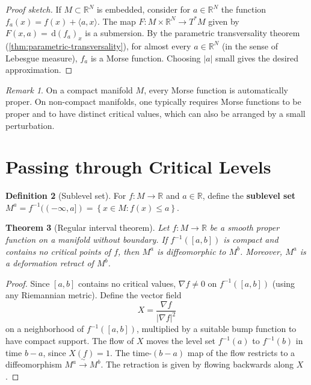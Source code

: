 \documentclass[12pt,a4paper,openany]{book}
\newtheorem{theorem}{Theorem}[section]
\theoremstyle{definition}
\newtheorem{definition}[theorem]{Definition}
\theoremstyle{remark}
\newtheorem{remark}[theorem]{Remark}
\newcommand{\R}{\mathbb{R}}
\newcommand{\dd}{\,\mathrm{d}}
\newcommand{\abs}[1]{\left\lvert #1 \right\rvert}
\newcommand{\set}[1]{\left\{ #1 \right\}}
\begin{document}
\begin{proof}[Proof sketch]
If $M \subset \R^N$ is embedded, consider for $a \in \R^N$ the function
$f_a(x) = f(x) + \langle a, x\rangle$. The map
$F\colon M \times \R^N \to T^*M$ given by $F(x,a) = \dd(f_a)_x$ is
a submersion. By the parametric transversality theorem
(\autoref{thm:parametric-transversality}),
for almost every $a \in \R^N$ (in the sense of Lebesgue measure),
$f_a$ is a Morse function. Choosing $\abs{a}$ small gives
the desired approximation.
\end{proof}

\begin{remark}\label{rem:morse-proper}
On a compact manifold $M$, every Morse function is automatically proper.
On non-compact manifolds, one typically requires Morse functions to be
proper and to have distinct critical values, which can also be arranged
by a small perturbation.
\end{remark}

\section{Passing through Critical Levels}\label{sec:critical-levels}

\begin{definition}[Sublevel set]\label{def:sublevel}
For $f\colon M \to \R$ and $a \in \R$, define the \textbf{sublevel set}
$M^a = f^{-1}((-\infty,a]) = \set{x \in M : f(x) \le a}$.
\end{definition}

\begin{theorem}[Regular interval theorem]\label{thm:regular-interval}
Let $f\colon M \to \R$ be a smooth proper function on a manifold
without boundary. If $f^{-1}([a,b])$ is compact and contains no
critical points of $f$, then $M^a$ is diffeomorphic to $M^b$.
Moreover, $M^a$ is a deformation retract of $M^b$.
\end{theorem}

\begin{proof}
Since $[a,b]$ contains no critical values, $\nabla f \neq 0$
on $f^{-1}([a,b])$ (using any Riemannian metric). Define the
vector field
\[
  X = \frac{\nabla f}{\abs{\nabla f}^2}
\]
on a neighborhood of $f^{-1}([a,b])$, multiplied by a suitable
bump function to have compact support. The flow of $X$ moves
the level set $f^{-1}(a)$ to $f^{-1}(b)$ in time $b-a$,
since $X(f) = 1$. The time-$(b-a)$ map of the flow restricts to
a diffeomorphism $M^a \xrightarrow{\;\sim\;} M^b$.
The retraction is given by flowing backwards along $X$.
\end{proof}
\end{document}
